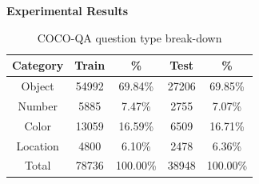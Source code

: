 \documentclass[serif,mathserif,final]{beamer}
\renewcommand{\*}[1]{\textbf{#1}}
\begin{document}
\begin{frame}{}
\begin{columns}[t]
\begin{column}{0.32\linewidth}
\begin{block}{\bf{\large Experimental Results}} 
\begin{table}[t!]
\caption{COCO-QA question type break-down}
\small
\label{tab:dataset_category_stats}
\begin{center}
\begin{tabular}{c c c c c}
\hline
Category & Train & \%       & Test  & \%       \\
\hline
Object   & 54992 & 69.84\%  & 27206 & 69.85\%  \\
Number   & 5885  & 7.47\%   & 2755  & 7.07\%   \\
Color    & 13059 & 16.59\%  & 6509  & 16.71\%  \\
Location & 4800  & 6.10\%   & 2478  & 6.36\%   \\
\hline
Total    & 78736 & 100.00\% & 38948 & 100.00\% \\
\hline
\end{tabular}
\end{center}
\end{table}
\vfill


\end{block}
\end{column}
\end{columns}
\end{frame}
\end{document}
